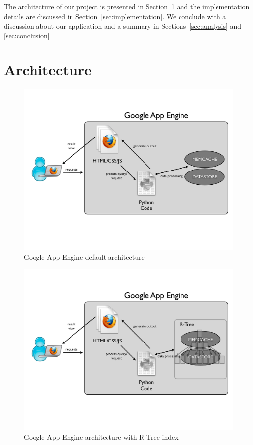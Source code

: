 \documentclass{scrartcl}
\begin{document}
The architecture of our project is presented in Section~\ref{sec:architecture} and the implementation details are discussed in Section~\ref{sec:implementation}. We conclude with a discussion about our application and a summary in Sections~\ref{sec:analysis} and \ref{sec:conclusion}

\section{Architecture}
\label{sec:architecture}
\begin{figure}[h!]
\begin{center}
\includegraphics[scale=0.3]{fig/gapps1}
\caption{Google App Engine default architecture}
\label{fig:gappsArch}
\end{center}
\end{figure}

\begin{figure}[h!]
\begin{center}
\includegraphics[scale=0.3]{fig/gapps2}
\caption{Google App Engine architecture with R-Tree index}
\label{fig:gappsArch2}
\end{center}
\end{figure}
\end{document}
